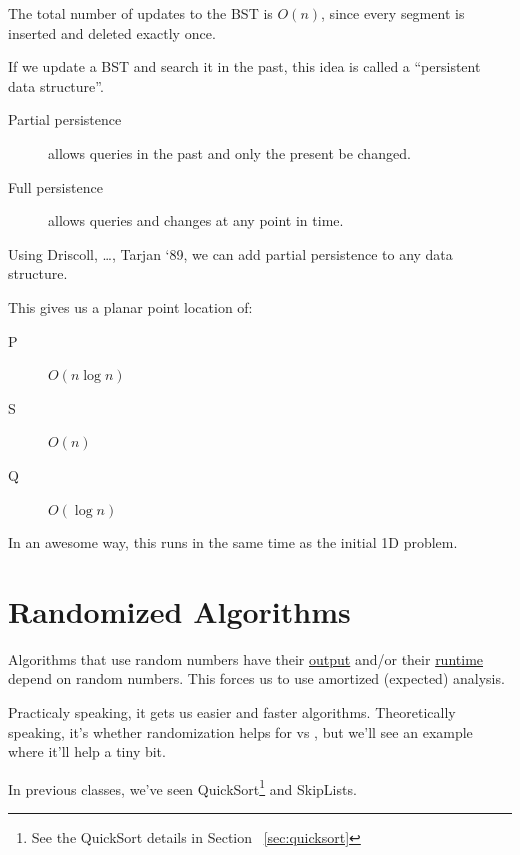                         The total number of updates to the BST is $O(n)$, since every segment is inserted and deleted exactly once.

                        If we update a BST and search it in the past, this idea is called a ``persistent data structure''.

                        \begin{description}
                            \item[Partial persistence] allows queries in the past and only the present be changed.
                            \item[Full persistence] allows queries and changes at any point in time.
                        \end{description}

                        Using Driscoll, \ldots, Tarjan `89, we can add partial persistence to any data structure.

                        This gives us a planar point location of:
                        \begin{description}
                            \item[P] $O(n \log n)$
                            \item[S] $O(n)$
                            \item[Q] $O(\log n)$
                        \end{description}
                        In an awesome way, this runs in the same time as the initial 1D problem.
        \chapter{Randomized Algorithms} %
        \label{cha:randomized_algorithms}
            Algorithms that use random numbers have their \uline{output} and/or their \uline{runtime} depend on random numbers.
            This forces us to use amortized (expected) analysis.

            Practicaly speaking, it gets us easier and faster algorithms.
            Theoretically speaking, it's \open whether randomization helps for \p vs \np, but we'll see an example where it'll help a tiny bit.

            In previous classes, we've seen QuickSort\footnote{See the QuickSort details in Section ~\ref{sec:quicksort}} and SkipLists.

